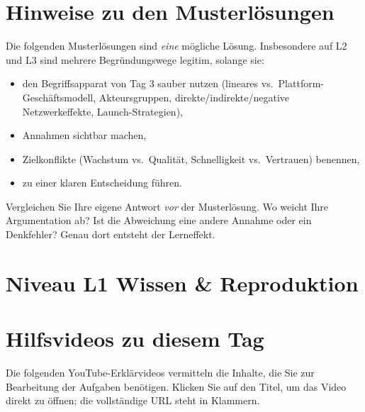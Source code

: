 \documentclass[11pt,a4paper,oneside]{article}
\begin{document}
\section*{Hinweise zu den Musterlösungen}
\thispagestyle{plain}

\noindent Die folgenden Musterlösungen sind \emph{eine} mögliche Lösung. Insbesondere auf L2 und L3 sind mehrere Begründungswege legitim, solange sie:

\begin{itemize}
  \item den Begriffsapparat von Tag 3 sauber nutzen (lineares vs.\ Plattform-Geschäftsmodell, Akteursgruppen, direkte/indirekte/negative Netzwerkeffekte, Launch-Strategien),
  \item Annahmen sichtbar machen,
  \item Zielkonflikte (Wachstum vs.\ Qualität, Schnelligkeit vs.\ Vertrauen) benennen,
  \item zu einer klaren Entscheidung führen.
\end{itemize}

\begin{infobox}
Vergleichen Sie Ihre eigene Antwort \emph{vor} der Musterlösung. Wo weicht Ihre Argumentation ab? Ist die Abweichung eine andere Annahme \textendash{} oder ein Denkfehler? Genau dort entsteht der Lerneffekt.
\end{infobox}

\clearpage

\section*{Niveau L1 \textendash{} Wissen \& Reproduktion}

\section*{Hilfsvideos zu diesem Tag}
\thispagestyle{plain}

\noindent Die folgenden YouTube-Erkl\"arvideos vermitteln die Inhalte, die Sie zur Bearbeitung der Aufgaben ben\"otigen. Klicken Sie auf den Titel, um das Video direkt zu \"offnen; die vollst\"andige URL steht in Klammern.
\end{document}
